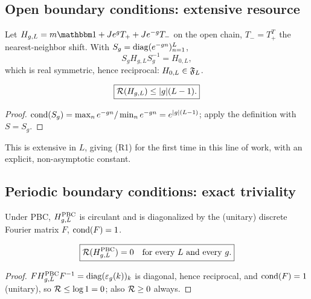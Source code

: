 \subsection{Open boundary conditions: extensive resource}

Let $H_{g,L}=m\id+Je^gT_++Je^{-g}T_-$ on the open chain, $T_-=T_+^T$
the nearest-neighbor shift. With $S_g=\operatorname{diag}(e^{-gn})_{n=1}^L$,
\begin{equation}
S_gH_{g,L}S_g^{-1}=H_{0,L},
\end{equation}
which is real symmetric, hence reciprocal: $H_{0,L}\in\mathfrak F_L$.

\begin{proposition}
\label{prop:hn-obc}
\begin{equation}
\boxed{\mathcal R(H_{g,L})\le|g|(L-1).}
\end{equation}
\end{proposition}
\begin{proof}
$\operatorname{cond}(S_g)=\max_n e^{-gn}/\min_n e^{-gn}=e^{|g|(L-1)}$; apply the
definition with $S=S_g$.
\end{proof}

This is extensive in $L$, giving (R1) for the first time in this
line of work, with an explicit, non-asymptotic constant.

\subsection{Periodic boundary conditions: exact triviality}
\label{subsec:pbc}

Under PBC, $H_{g,L}^{\rm PBC}$ is circulant and is diagonalized by
the (unitary) discrete Fourier matrix $F$, $\operatorname{cond}(F)=1$.

\begin{proposition}
\label{prop:hn-pbc}
\begin{equation}
\boxed{\mathcal R(H_{g,L}^{\rm PBC})=0\quad\text{for every }L\text{ and every }g.}
\end{equation}
\end{proposition}
\begin{proof}
$F H_{g,L}^{\rm PBC}F^{-1}=\operatorname{diag}(\varepsilon_g(k))_k$ is diagonal,
hence reciprocal, and $\operatorname{cond}(F)=1$ (unitary), so
$\mathcal R\le\log1=0$; also $\mathcal R\ge0$ always.
\end{proof}

